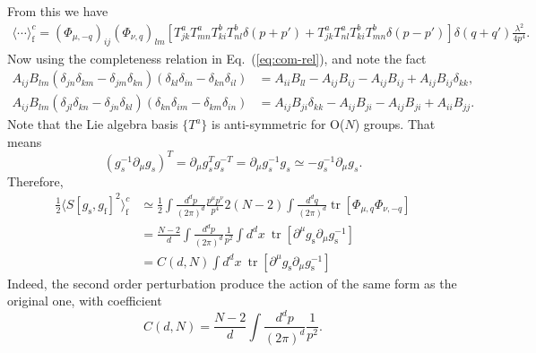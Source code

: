 \documentclass[aps,prb,superscriptaddress,nofootinbib]{revtex4}
\def \tr{\operatorname{tr}}
\begin{document}
From this we have
\begin{equation}
\begin{aligned}
	\langle \cdots \rangle^c_{\mathrm{f}}
	= (\Phi_{\mu,-q})_{ij} (\Phi_{\nu,q})_{lm} \left[T_{jk}^a T_{mn}^a T_{ki}^b T_{nl}^b \delta(p+p') +T_{jk}^a T_{nl}^a T_{ki}^b T_{mn}^b \delta(p-p')\right] \delta(q+q')\frac{\lambda^2}{4p^4}.
\end{aligned}
\end{equation}
Now using the completeness relation in Eq.~(\ref{eq:com-rel}), and note the fact
\begin{equation}
\begin{aligned}
	A_{ij}B_{lm}(\delta_{jn}\delta_{km}-\delta_{jm}\delta_{kn})(\delta_{kl}\delta_{in}-\delta_{kn}\delta_{il})
	&= A_{ii}B_{ll} - A_{ij}B_{ij} - A_{ij}B_{ij}+A_{ij}B_{ij}\delta_{kk}, \\
	A_{ij}B_{lm}(\delta_{jl}\delta_{kn}-\delta_{jn}\delta_{kl})(\delta_{kn}\delta_{im}-\delta_{km}\delta_{in})
	&= A_{ij}B_{ji}\delta_{kk} - A_{ij}B_{ji}-A_{ij}B_{ji}+A_{ii}B_{jj}.
\end{aligned}
\end{equation}
Note that the Lie algebra basis $\{T^a\}$ is anti-symmetric for O($N$) groups. 
That means
\begin{equation}
	\left(g_s^{-1}\partial_\mu g_s\right)^T = \partial_\mu g_s^T g_s^{-T}
	=\partial_\mu g_s^{-1} g_s 
	\simeq -g_s^{-1} \partial_\mu g_s.
\end{equation}
Therefore,
\begin{equation}
\begin{aligned}
	\frac{1}{2}\langle S[g_{\mathrm{s}},g_{\mathrm{f}}]^2\rangle_{\mathrm{f}}^c
	&\simeq \frac{1}{2} \int \frac{d^d p}{(2\pi)^d}  \frac{p^\mu p^\nu}{p^4} 2(N-2) \int \frac{d^d q}{(2\pi)^d} \tr[\Phi_{\mu,q}\Phi_{\nu,-q}] \\
	&= \frac{N-2}{d}\int \frac{d^d p}{(2\pi)^d}  \frac{1}{p^2} \int d^d x\ \tr[\partial^\mu g_{\mathrm{s}} \partial_\mu g_{\mathrm{s}}^{-1}] \\
	&= C(d,N) \int d^d x\ \tr[\partial^\mu g_{\mathrm{s}} \partial_\mu g_{\mathrm{s}}^{-1}]
\end{aligned}
\end{equation}
Indeed, the second order perturbation produce the action of the same form as the original one, with coefficient
\begin{equation}
	C(d,N) = \frac{N-2}{d}\int \frac{d^d p}{(2\pi)^d}  \frac{1}{p^2}.
\end{equation}
\end{document}
